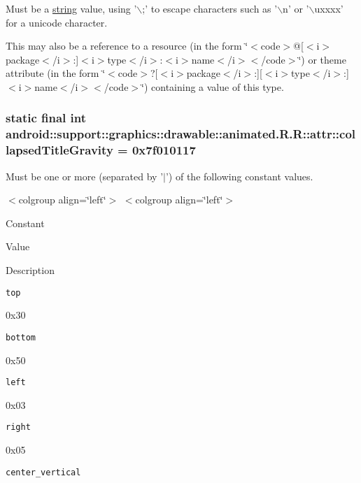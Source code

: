 Must be a \hyperlink{classandroid_1_1support_1_1graphics_1_1drawable_1_1animated_1_1_r_1_1string}{string} value, using '$\backslash$;' to escape characters such as '$\backslash$n' or '$\backslash$uxxxx' for a unicode character. 

This may also be a reference to a resource (in the form \char`\"{}$<$code$>$@\mbox{[}$<$i$>$package$<$/i$>$:\mbox{]}$<$i$>$type$<$/i$>$:$<$i$>$name$<$/i$>$$<$/code$>$\char`\"{}) or theme attribute (in the form \char`\"{}$<$code$>$?\mbox{[}$<$i$>$package$<$/i$>$:\mbox{]}\mbox{[}$<$i$>$type$<$/i$>$:\mbox{]}$<$i$>$name$<$/i$>$$<$/code$>$\char`\"{}) containing a value of this type. \hypertarget{classandroid_1_1support_1_1graphics_1_1drawable_1_1animated_1_1_r_1_1attr_ef1beb0c4bd13691d0ec39294b3b0f2c}{
\subsubsection[{collapsedTitleGravity}]{\setlength{\rightskip}{0pt plus 5cm}static final int android::support::graphics::drawable::animated.R.R::attr::collapsedTitleGravity = 0x7f010117}}
\label{classandroid_1_1support_1_1graphics_1_1drawable_1_1animated_1_1_r_1_1attr_ef1beb0c4bd13691d0ec39294b3b0f2c}


Must be one or more (separated by '$|$') of the following constant values. \begin{TabularC}{0}
\hline
\end{TabularC}
$<$colgroup align=\char`\"{}left\char`\"{}$>$ $<$colgroup align=\char`\"{}left\char`\"{}$>$ 

Constant

Value

Description 

{\tt top}

0x30

{\tt bottom}

0x50

{\tt left}

0x03

{\tt right}

0x05

{\tt center\_\-vertical}

